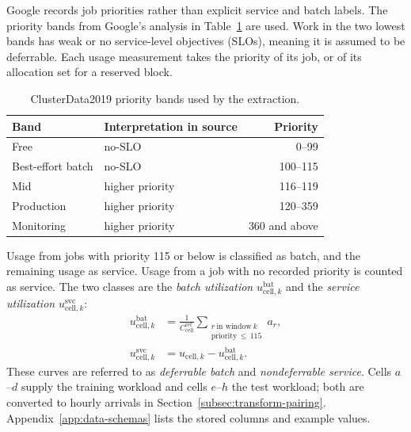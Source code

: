 \documentclass{UNCC-thesis}
\begin{document}
Google records job priorities rather than explicit service and batch
labels. The priority bands from Google's analysis in
Table~\ref{tab:priority-bands} are used. Work in the two lowest bands has weak
or no service-level objectives (SLOs), meaning it is assumed to be deferrable. Each usage measurement takes the
priority of its job, or of its allocation set for a reserved block.

\begin{table}[htbp]
  \centering
  \footnotesize
  \caption{ClusterData2019 priority bands used by the extraction.}
  \label{tab:priority-bands}
  \begin{tabular}{@{}llr@{}}
    \toprule
    Band & Interpretation in source & Priority \\
    \midrule
    Free & no-SLO & 0--99 \\
    Best-effort batch & no-SLO & 100--115 \\
    Mid & higher priority & 116--119 \\
    Production & higher priority & 120--359 \\
    Monitoring & higher priority & 360 and above \\
    \bottomrule
  \end{tabular}
\end{table}

Usage from jobs with priority 115 or below is classified as batch, and the
remaining usage as service. Usage from a job with no recorded priority is
counted as service. The two classes are the \emph{batch utilization}
\(u^{\mathrm{bat}}_{\mathrm{cell},k}\) and the \emph{service utilization}
\(u^{\mathrm{svc}}_{\mathrm{cell},k}\):
\begin{align}
  u^{\mathrm{bat}}_{\mathrm{cell},k}
  &=
  \frac{1}{C^{\mathrm{ref}}_{\mathrm{cell}}}
  \sum_{\substack{r\ \text{in window}\ k\\ \text{priority}\,\leq\,115}} a_r,
  \label{eq:batch-utilization}\\
  u^{\mathrm{svc}}_{\mathrm{cell},k}
  &=
  u_{\mathrm{cell},k}-u^{\mathrm{bat}}_{\mathrm{cell},k}.
  \label{eq:service-utilization}
\end{align}
These curves are referred to as \emph{deferrable batch} and
\emph{nondeferrable service}. Cells \(a\)--\(d\) supply the training
workload and cells \(e\)--\(h\) the test workload; both are converted to
hourly arrivals in Section~\ref{subsec:transform-pairing}. Appendix~\ref{app:data-schemas} lists the stored columns and example values.
\end{document}
